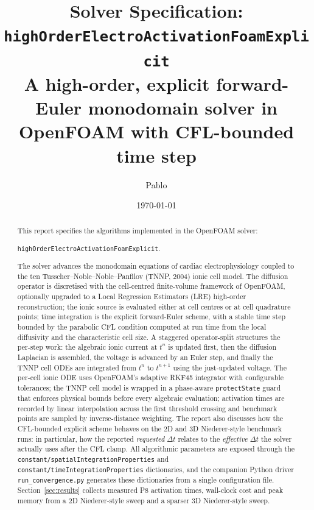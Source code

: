 \documentclass[11pt,a4paper]{article}
\title{Solver Specification:\\
       \texorpdfstring{\texttt{highOrderElectroActivationFoamExplicit}}{highOrderElectroActivationFoamExplicit}\\
       \large A high-order, explicit forward-Euler
       monodomain solver in OpenFOAM with CFL-bounded time step}
\author{Pablo}
\date{\today}
\newcommand{\code}[1]{\texttt{\small #1}}
\begin{document}
\maketitle

\begin{abstract}
This report specifies the algorithms implemented in the OpenFOAM solver:

\begin{center}
\code{highOrderElectroActivationFoamExplicit}.
\end{center}

The solver advances the monodomain equations of cardiac
electrophysiology coupled to the ten Tusscher--Noble--Noble--Panfilov
(TNNP, 2004) ionic cell model. The diffusion operator is discretised
with the cell-centred finite-volume framework of OpenFOAM, optionally
upgraded to a Local Regression Estimators (LRE) high-order
reconstruction; the ionic source is evaluated either at cell centres
or at cell quadrature points; time integration is the explicit
forward-Euler scheme, with a stable time step bounded by the
parabolic CFL condition computed at run time from the local
diffusivity and the characteristic cell size. A staggered
operator-split structures the per-step work: the algebraic ionic
current at $t^{n}$ is updated first, then the diffusion Laplacian is
assembled, the voltage is advanced by an Euler step, and finally the
TNNP cell ODEs are integrated from $t^{n}$ to $t^{n+1}$ using the
just-updated voltage. The per-cell ionic ODE uses OpenFOAM's
adaptive RKF45 integrator with configurable tolerances; the TNNP
cell model is wrapped in a phase-aware \code{protectState} guard that
enforces physical bounds before every algebraic evaluation;
activation times are recorded by linear interpolation across the
first threshold crossing and benchmark points are sampled by
inverse-distance weighting. The report also discusses how the
CFL-bounded explicit scheme behaves on the 2D and 3D Niederer-style
benchmark runs: in
particular, how the reported \emph{requested} $\Delta t$ relates to
the \emph{effective} $\Delta t$ the solver actually uses after the
CFL clamp. All algorithmic parameters are exposed through the
\code{constant/spatialIntegrationProperties} and
\code{constant/timeIntegrationProperties} dictionaries, and the
companion Python driver \code{run\_convergence.py} generates these
dictionaries from a single configuration file. Section~\ref{sec:results}
collects measured P8 activation times, wall-clock cost and peak
memory from a 2D Niederer-style sweep and a sparser 3D Niederer-style
sweep.
\end{abstract}
\end{document}
